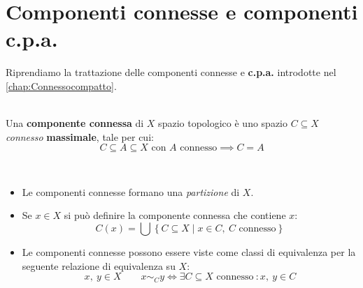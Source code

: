 \section{Componenti connesse e componenti c.p.a.}
Riprendiamo la trattazione delle componenti connesse e \textbf{c.p.a.} introdotte nel \autoref{chap:Connessocompatto}.
\begin{define}~{}\\
	Una \textbf{componente connessa} di $X$ spazio topologico è uno spazio $C\subseteq X$ \textit{connesso} \textbf{massimale}, tale per cui:
	\begin{equation}
		C\subseteq A\subseteq X\text{ con }A\text{ connesso}\implies C=A
	\end{equation}
\vspace{-6mm}
\end{define}
\begin{observes}~{}
\begin{itemize}
	\item Le componenti connesse formano una \textit{partizione} di $X$.
	\item Se $x\in X$ si può definire la componente connessa che contiene $x$:
	\begin{equation}
		C\left(x\right)=\bigcup\left\{C\subseteq X\mid x\in C,\ C\text{ connesso}\right\}
	\end{equation}
\item Le componenti connesse possono essere viste come classi di equivalenza per la seguente relazione di equivalenza su $ X $:
	\begin{equation}
		x,\ y\in X\qquad x\sim_C y\iff \exists C\subseteq X\text{ connesso}\ \colon x,\ y\in C
	\end{equation}
\end{itemize}
\vspace{-6mm}
\end{observes}
